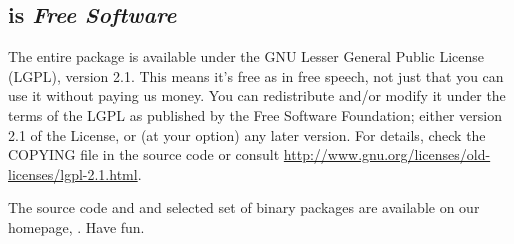 \documentclass[11pt,a4paper,twoside]{gmxmanual}
\begin{document}
\subsection*{{\gromacs} is {\em Free Software}}
The entire {\gromacs} package is available under the GNU Lesser
General Public License (LGPL), version 2.1. This means it's free as in free
speech, not just that you can use it without paying us money.
You can redistribute {\gromacs} and/or modify it under the terms of the LGPL
as published by the Free Software Foundation;
either version 2.1 of the License, or (at your option) any later version.
For details, check the COPYING file in the source code or consult
\href{http://www.gnu.org/licenses/old-licenses/lgpl-2.1.html}{http://www.gnu.org/licenses/old-licenses/lgpl-2.1.html}.

The {\gromacs} source code and and selected set of binary packages are
available on our homepage, \wwwpage. Have fun.


\newpage
%
\tableofcontents

%
%
\cleardoublepage
{}













%
%
\appendix




%


%
%
\cleardoublepage
{}





%
%
\cleardoublepage
{}



\renewcommand{\see}[2]{\mbox{} \mbox{\textit{see} #1}}
\printindex
\end{document}
